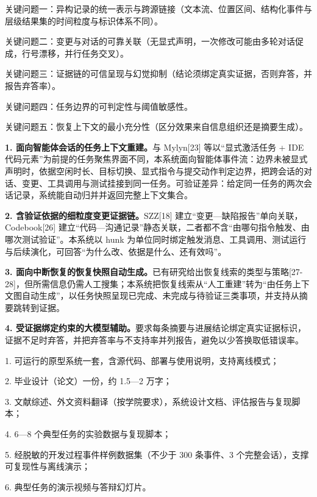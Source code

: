 
关键问题一：异构记录的统一表示与跨源链接（文本流、位置区间、结构化事件与层级结果集的时间粒度与标识体系不同）。

关键问题二：变更与对话的可靠关联（无显式声明，一次修改可能由多轮对话促成，行号漂移，并行任务交叉）。

关键问题三：证据链的可信呈现与幻觉抑制（结论须绑定真实证据，否则弃答，并报告弃答率）。

关键问题四：任务边界的可判定性与阈值敏感性。

关键问题五：恢复上下文的最小充分性（区分效果来自信息组织还是摘要生成）。


\textbf{1. 面向智能体会话的任务上下文重建。}与 Mylyn[23] 等以“显式激活任务 + IDE 代码元素”为前提的任务聚焦界面不同，本系统面向智能体事件流：边界未被显式声明时，依据空闲时长、目标切换、显式指令与提交动作判定边界，把跨会话的对话、变更、工具调用与测试挂接到同一任务。可验证差异：给定同一任务的两次会话记录，系统能自动归并并返回完整上下文集合。

\textbf{2. 含验证依据的细粒度变更证据链。}SZZ[18] 建立“变更—缺陷报告”单向关联，Codebook[26] 建立“代码—沟通记录”静态关联，二者都不含“由哪句指令触发、由哪次测试验证”。本系统以 hunk 为单位同时绑定触发消息、工具调用、测试运行与后续演化，可回答“为什么改、依据是什么、还有效吗”。

\textbf{3. 面向中断恢复的恢复快照自动生成。}已有研究给出恢复线索的类型与策略[27-28]，但所需信息仍需人工搜集；本系统把恢复线索从“人工重建”转为“由任务上下文图自动生成”，以任务快照呈现已完成、未完成与待验证三类事项，并支持从摘要跳转到证据。

\textbf{4. 受证据绑定约束的大模型辅助。}要求每条摘要与进展结论绑定真实证据标识，证据不足时弃答，并把弃答率与不支持率并列报告，避免以少答换取低错误率。


1. 可运行的原型系统一套，含源代码、部署与使用说明，支持离线模式；

2. 毕业设计（论文）一份，约 1.5—2 万字；

3. 文献综述、外文资料翻译（按学院要求），系统设计文档、评估报告与复现脚本；

4. 6—8 个典型任务的实验数据与复现脚本；

5. 经脱敏的开发过程事件样例数据集（不少于 300 条事件、3 个完整会话），支撑可复现性与离线演示；

6. 典型任务的演示视频与答辩幻灯片。


